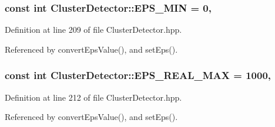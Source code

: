 \hypertarget{classmultiscale_1_1analysis_1_1ClusterDetector_a6c3517e03d1fd2c6b4d6cd0d81eb8684}{
\subsubsection[{E\-P\-S\-\_\-\-M\-I\-N}]{\setlength{\rightskip}{0pt plus 5cm}const int Cluster\-Detector\-::\-E\-P\-S\-\_\-\-M\-I\-N = 0\hspace{0.3cm}{\ttfamily [static]}, {\ttfamily [private]}}}\label{classmultiscale_1_1analysis_1_1ClusterDetector_a6c3517e03d1fd2c6b4d6cd0d81eb8684}


Definition at line 209 of file Cluster\-Detector.\-hpp.



Referenced by convert\-Eps\-Value(), and set\-Eps().

\hypertarget{classmultiscale_1_1analysis_1_1ClusterDetector_a3e60b9e068a8addf9dd27382c74e6d62}{
\subsubsection[{E\-P\-S\-\_\-\-R\-E\-A\-L\-\_\-\-M\-A\-X}]{\setlength{\rightskip}{0pt plus 5cm}const int Cluster\-Detector\-::\-E\-P\-S\-\_\-\-R\-E\-A\-L\-\_\-\-M\-A\-X = 1000\hspace{0.3cm}{\ttfamily [static]}, {\ttfamily [private]}}}\label{classmultiscale_1_1analysis_1_1ClusterDetector_a3e60b9e068a8addf9dd27382c74e6d62}


Definition at line 212 of file Cluster\-Detector.\-hpp.



Referenced by convert\-Eps\-Value(), and set\-Eps().

